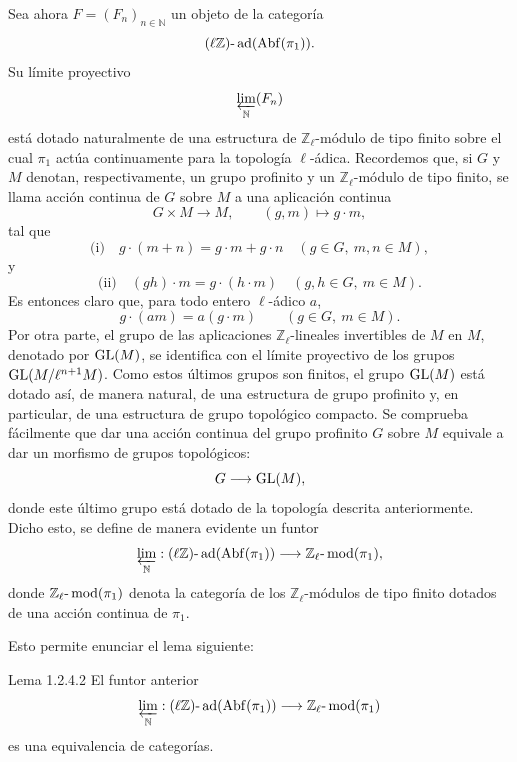Sea ahora \(F=(F_n)_{n\in\mathbb N}\) un objeto de la categoría
\[
(\ell\mathbb Z)\text{-}\operatorname{ad}(\operatorname{Abf}(\pi_1)).
\]
Su límite proyectivo
\[
\varprojlim_{\mathbb N}(F_n)
\]
está dotado naturalmente de una estructura de \(\mathbb Z_\ell\)-módulo de tipo finito sobre el cual \(\pi_1\) actúa continuamente para la topología \(\ell\)-ádica. Recordemos que, si \(G\) y \(M\) denotan, respectivamente, un grupo profinito y un \(\mathbb Z_\ell\)-módulo de tipo finito, se llama acción continua de \(G\) sobre \(M\) a una aplicación continua
\[
G\times M\longrightarrow M,\qquad (g,m)\longmapsto g\cdot m,
\]
tal que
\[
\text{(i)}\quad g\cdot(m+n)=g\cdot m+g\cdot n\quad (g\in G,\ m,n\in M),
\]
y
\[
\text{(ii)}\quad (gh)\cdot m=g\cdot(h\cdot m)\quad (g,h\in G,\ m\in M).
\]
Es entonces claro que, para todo entero \(\ell\)-ádico \(a\),
\[
g\cdot(am)=a(g\cdot m)\qquad (g\in G,\ m\in M).
\]
Por otra parte, el grupo de las aplicaciones \(\mathbb Z_\ell\)-lineales invertibles de \(M\) en \(M\), denotado por \(\operatorname{GL}(M)\), se identifica con el límite proyectivo de los grupos \(\operatorname{GL}(M/\ell^{n+1}M)\). Como estos últimos grupos son finitos, el grupo \(\operatorname{GL}(M)\) está dotado así, de manera natural, de una estructura de grupo profinito y, en particular, de una estructura de grupo topológico compacto. Se comprueba fácilmente que dar una acción continua del grupo profinito \(G\) sobre \(M\) equivale a dar un morfismo de grupos topológicos:
\[
G\longrightarrow \operatorname{GL}(M),
\]
donde este último grupo está dotado de la topología descrita anteriormente. Dicho esto, se define de manera evidente un funtor
\[
\varprojlim_{\mathbb N}:(\ell\mathbb Z)\text{-}\operatorname{ad}(\operatorname{Abf}(\pi_1))\longrightarrow
\mathbb Z_\ell\text{-}\operatorname{mod}(\pi_1),
\]
donde \(\mathbb Z_\ell\text{-}\operatorname{mod}(\pi_1)\) denota la categoría de los \(\mathbb Z_\ell\)-módulos de tipo finito dotados de una acción continua de \(\pi_1\).

Esto permite enunciar el lema siguiente:

\begin{statement}{Lema 1.2.4.2}
El funtor anterior
\[
\varprojlim_{\mathbb N}:(\ell\mathbb Z)\text{-}\operatorname{ad}(\operatorname{Abf}(\pi_1))
\longrightarrow \mathbb Z_\ell\text{-}\operatorname{mod}(\pi_1)
\]
es una equivalencia de categorías.
\end{statement}

